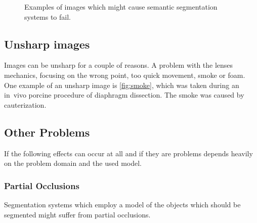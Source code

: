 \begin{figure}
{}
%
\caption{Examples of images which might cause semantic segmentation systems to fail.}
\label{fig:test}
\end{figure}


\subsection{Unsharp images}
Images can be unsharp for a couple of reasons. A problem with the lenses
mechanics, focusing on the wrong point, too quick movement, smoke or foam.
One example of an unsharp image is \cref{fig:smoke}, which was taken during an
in~vivo porcine procedure of diaphragm dissection. The smoke was caused by
cauterization.


\subsection{Other Problems}
If the following effects can occur at all and if they are problems depends
heavily on the problem domain and the used model.

\subsubsection{Partial Occlusions}
Segmentation systems which employ a model of the objects which should be
segmented might suffer from partial occlusions.

